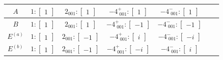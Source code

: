 \documentclass[fleqn,8pt,landscape]{jsarticle}
\begin{document}
\begin{longtable}{ccccccc}
$ A $ & $ 1:\begin{bmatrix} 1 \end{bmatrix} $ & $ 2{}_{001}:\begin{bmatrix} 1 \end{bmatrix} $ & $ -4^{+}_{\,\,001}:\begin{bmatrix} 1 \end{bmatrix} $ & $ -4^{-}_{\,\,001}:\begin{bmatrix} 1 \end{bmatrix} $ \\ \hline
$ B $ & $ 1:\begin{bmatrix} 1 \end{bmatrix} $ & $ 2{}_{001}:\begin{bmatrix} 1 \end{bmatrix} $ & $ -4^{+}_{\,\,001}:\begin{bmatrix} -1 \end{bmatrix} $ & $ -4^{-}_{\,\,001}:\begin{bmatrix} -1 \end{bmatrix} $ \\ \hline
$ E^{(a)} $ & $ 1:\begin{bmatrix} 1 \end{bmatrix} $ & $ 2{}_{001}:\begin{bmatrix} -1 \end{bmatrix} $ & $ -4^{+}_{\,\,001}:\begin{bmatrix} i \end{bmatrix} $ & $ -4^{-}_{\,\,001}:\begin{bmatrix} - i \end{bmatrix} $ \\ \hline
$ E^{(b)} $ & $ 1:\begin{bmatrix} 1 \end{bmatrix} $ & $ 2{}_{001}:\begin{bmatrix} -1 \end{bmatrix} $ & $ -4^{+}_{\,\,001}:\begin{bmatrix} - i \end{bmatrix} $ & $ -4^{-}_{\,\,001}:\begin{bmatrix} i \end{bmatrix} $ \\
\end{longtable}
\end{document}
